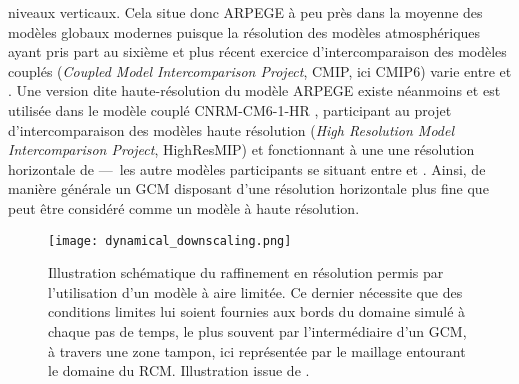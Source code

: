 \documentclass[../main.tex]{subfiles}
\begin{document}
niveaux verticaux. Cela situe donc ARPEGE à peu près dans la moyenne des modèles globaux modernes puisque la résolution des modèles atmosphériques ayant pris
part au sixième et plus récent exercice d'intercomparaison des modèles couplés (\textit{Coupled Model Intercomparison Project}, CMIP, ici CMIP6)
\parencite{eyring_overview_2016} varie entre  et  \parencite[][Tableau AII.5]{ipcc_annex_2021}. Une version dite haute-résolution du modèle
ARPEGE existe néanmoins et est utilisée dans le modèle couplé CNRM-CM6-1-HR \parencite{saint-martin_tracking_2021}, participant au projet d'intercomparaison des
modèles haute résolution (\textit{High Resolution Model Intercomparison Project}, HighResMIP) \parencite{haarsma_high_2016} et fonctionnant à une une résolution
horizontale de  ---~les autre modèles participants se situant entre  et  \parencite[][Tableau AII.6]{ipcc_annex_2021}. Ainsi, de manière
générale un GCM disposant d'une résolution horizontale plus fine que  peut être considéré comme un modèle à haute résolution.
%
\begin{figure}[t]
    \centering
    \texttt{[image: dynamical\_downscaling.png]}
    \caption{Illustration schématique du raffinement en résolution permis par l'utilisation d'un modèle à aire limitée. Ce dernier nécessite que des
    conditions limites lui soient fournies aux bords du domaine simulé à chaque pas de temps, le plus souvent par l'intermédiaire d'un GCM, à travers une zone
    tampon, ici représentée par le maillage entourant le domaine du RCM. Illustration issue de \hbox{\cite{giorgi_regional_2015}}.}
    \label{fig:dynamical_downscaling}
\end{figure}
\end{document}
